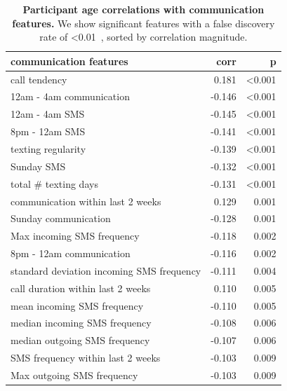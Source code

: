 \documentclass[acmlarge]{acmart}
\begin{document}
\begin{table}[h]
    \centering
    \begin{tabular}{lrr}
    \toprule
    communication features &   corr &     p \\
    \midrule
    call tendency                             &  0.181 & <0.001 \\
    12am - 4am communication                  & -0.146 & <0.001 \\
    12am - 4am SMS                            & -0.145 & <0.001 \\
    8pm - 12am SMS                            & -0.141 & <0.001 \\
    texting regularity                        & -0.139 & <0.001 \\
    Sunday SMS                                & -0.132 & <0.001 \\
    total \# texting days                     & -0.131 & <0.001 \\
    communication within last 2 weeks         &  0.129 & 0.001 \\
    Sunday communication                      & -0.128 & 0.001 \\
    Max incoming SMS frequency                & -0.118 & 0.002 \\
    8pm - 12am communication                  & -0.116 & 0.002 \\
    standard deviation incoming SMS frequency & -0.111 & 0.004 \\
    call duration within last 2 weeks         &  0.110 & 0.005 \\
    mean incoming SMS frequency               & -0.110 & 0.005 \\
    median incoming SMS frequency             & -0.108 & 0.006 \\
    median outgoing SMS frequency             & -0.107 & 0.006 \\
    SMS frequency within last 2 weeks         & -0.103 & 0.009 \\
    Max outgoing SMS frequency                & -0.103 & 0.009 \\
    \bottomrule
    \end{tabular}
    \caption{\textbf{Participant age correlations with communication features.} We show significant features with a false discovery rate of <0.01~\cite{benjamini1995fdr}, sorted by correlation magnitude.}
    \label{tab:age_comm_corr}
\end{table}
\end{document}
